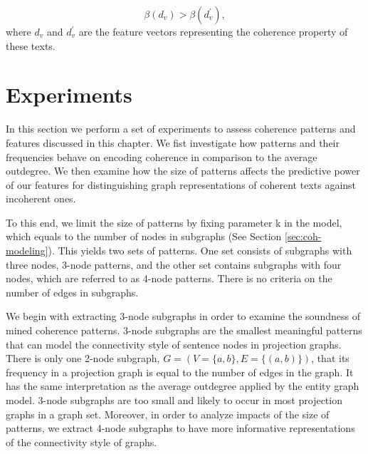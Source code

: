 \begin{equation}
\beta (d_v) > \beta (d^\prime_v),
\end{equation}
where $d_v$ and $d^\prime_v$ are the feature vectors representing the coherence property of these texts. 

\section{Experiments}
\label{sec:exp}

In this section we perform a set of experiments to assess coherence patterns and features discussed in this chapter. 
We fist investigate how patterns and their frequencies behave on encoding coherence in comparison to the average outdegree.  
We then examine how the size of patterns affects the predictive power of our features for distinguishing graph representations of coherent texts against incoherent ones. 

To this end, we limit the size of patterns by fixing parameter k in the model, which equals to the number of nodes in subgraphs (See Section \ref{sec:coh-modeling}). 
This yields two sets of patterns. 
One set consists of subgraphs with three nodes, 3-node patterns, and the other set contains subgraphs with four nodes, which are referred to as 4-node patterns.  
There is no criteria on the number of edges in subgraphs.  

We begin with extracting 3-node subgraphs in order to examine the soundness of mined coherence patterns.  
3-node subgraphs are the smallest meaningful patterns that can model the connectivity style of sentence nodes in projection graphs. 
There is only one 2-node subgraph, $G = \left( V = \lbrace a,b \rbrace, E=\lbrace \left( a, b \right) \rbrace \right)$, that its frequency in a projection graph is equal to the number of edges in the graph. 
It has the same interpretation as the average outdegree applied by the entity graph model.  
3-node subgraphs are too small and likely to occur in most projection graphs in a graph set. 
Moreover, in order to analyze impacts of the size of patterns, we extract 4-node subgraphs to have more informative representations of the connectivity style of graphs. 

